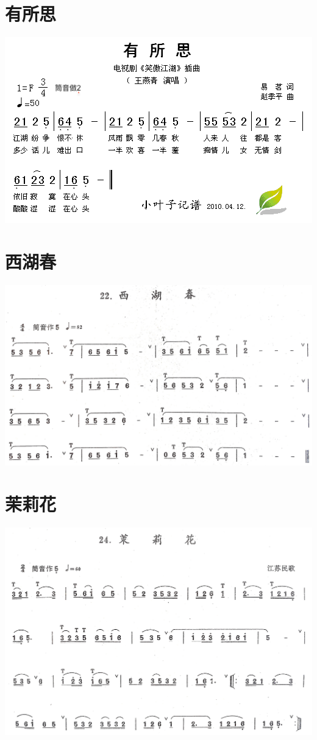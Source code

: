 \documentclass[cn,pad,twocol]{elegantbook}
\begin{document}
\section{有所思}
    \includegraphics[width=\textwidth]{dongxiao/20200710-有所思}
\section{西湖春}
    \includegraphics[width=\textwidth]{dongxiao/20200711-西湖春.jpg}
\section{茉莉花}
    \includegraphics[width=\textwidth]{dongxiao/20200711-茉莉花.jpg}
\end{document}
